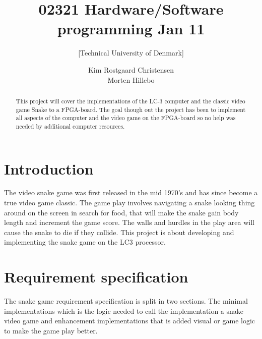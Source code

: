 \documentclass{acm_proc_article-sp}
\begin{document}
\title{02321 Hardware/Software programming Jan 11}
\subtitle{[Technical University of Denmark]
}

\author{
\alignauthor 
Kim Rostgaard Christensen\\
\alignauthor 
Morten Hillebo
}




\begin{abstract}
This project will cover the implementations of the LC-3 computer and the classic video game Snake to a FPGA-board. 
The goal though out the project has been to implement all aspects of the computer and the video game on the FPGA-board so no help was needed by additional computer resources.
\end{abstract}

\section{Introduction}
\label{sec:introduction}

The video snake game was first released in the mid 1970's and has since become a true video game classic. The game play involves navigating a snake looking thing around on the screen in search for food, that will make the snake gain body length and increment the game score. 
The walls and hurdles in the play area will cause the snake to die if they collide.
This project is about developing and implementing the snake game on the LC3 processor. 
%

\section{Requirement specification}
The snake game requirement specification is split in two sections. The minimal implementations which is the logic needed to call the implementation a snake video game and enhancement implementations that is added visual or game logic to make the game play better. 
\end{document}
